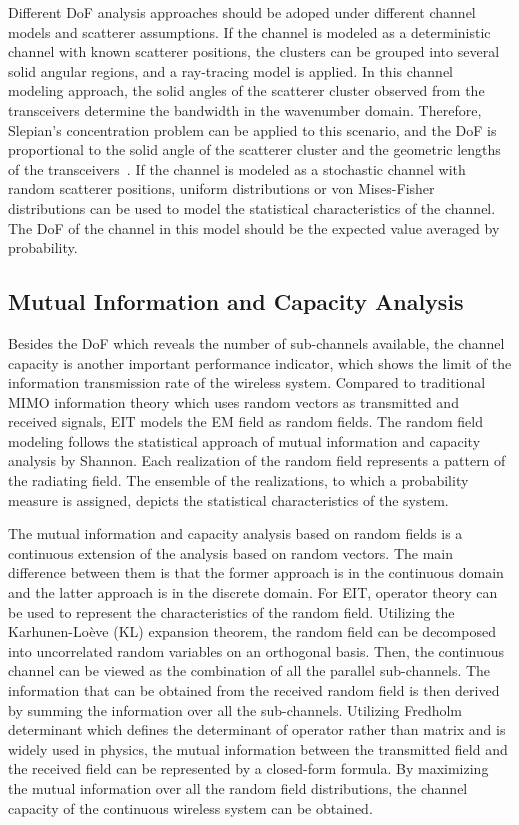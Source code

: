 \documentclass[journal,twocolumn]{IEEEtran}
\begin{document}
Different DoF analysis approaches should be adoped under different channel models and scatterer assumptions. 
If the channel is modeled as a deterministic channel with known scatterer positions, the clusters can be grouped into several solid angular regions, and a ray-tracing model is applied. 
In this channel modeling approach, the solid angles of the scatterer cluster observed from the transceivers determine the bandwidth in the wavenumber domain. 
Therefore, Slepian's concentration problem can be applied to this scenario, and the DoF is proportional to the solid angle of the scatterer cluster and the geometric lengths of the transceivers~\cite{poon2005degrees}. 
If the channel is modeled as a stochastic channel with random scatterer positions, uniform distributions or von Mises-Fisher distributions can be used to model the statistical characteristics of the channel. 
The DoF of the channel in this model should be the expected value averaged by probability.


\subsection{Mutual Information and Capacity Analysis}
Besides the DoF which reveals the number of sub-channels available, the channel capacity is another important performance indicator, which shows the limit of the information transmission rate of the wireless system. Compared to traditional MIMO information theory which uses random vectors as transmitted and received signals, EIT models the EM field as random fields. The random field modeling follows the statistical approach of mutual information and capacity analysis by Shannon. Each realization of the random field represents a pattern of the radiating field. The ensemble of the realizations, to which a probability measure is assigned, depicts the statistical characteristics of the system. 

The mutual information and capacity analysis based on random fields is a continuous extension of the analysis based on random vectors. The main difference between them is that the former approach is in the continuous domain and the latter approach is in the discrete domain. For EIT, operator theory can be used to represent the characteristics of the random field. 
Utilizing the Karhunen-Lo\`{e}ve (KL) expansion theorem, the random field can be decomposed into uncorrelated random variables on an orthogonal basis. Then, the continuous channel can be viewed as the combination of all the parallel sub-channels. The information that can be obtained from the received random field is then derived by summing the information over all the sub-channels. Utilizing Fredholm determinant which defines the determinant of operator rather than matrix and is widely used in physics, the mutual information between the transmitted field and the received field can be represented by a closed-form formula. By maximizing the mutual information over all the random field distributions, the channel capacity of the continuous wireless system can be obtained. 
\end{document}
